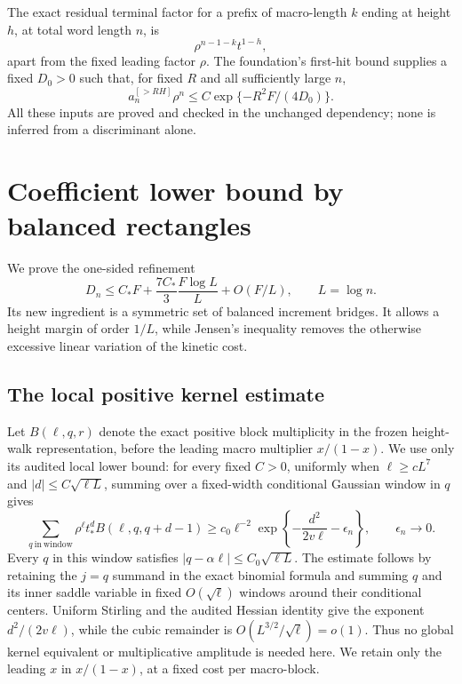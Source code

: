 \documentclass[11pt,letterpaper]{article}
\numberwithin{equation}{section}
\theoremstyle{remark}\newtheorem{remark}[theorem]{Remark}
\begin{document}
The exact residual terminal factor for a prefix of macro-length $k$ ending at height $h$, at total word length $n$, is
\begin{equation}\label{a61:o2:eq:terminal}
 \rho^{n-1-k}t^{1-h},
\end{equation}
apart from the fixed leading factor $\rho$. The foundation's first-hit bound supplies a fixed $D_0>0$ such that, for fixed $R$ and all sufficiently large $n$,
\begin{equation}\label{a61:o2:eq:first-hit}
 a_n^{[>RH]}\rho^n\le C\exp\{-R^2F/(4D_0)\}.
\end{equation}
All these inputs are proved and checked in the unchanged dependency; none is inferred from a discriminant alone.

\section{Coefficient lower bound by balanced rectangles}
\label{a61:o2:low:section}

We prove the one-sided refinement
\begin{equation}\label{a61:o2:low:target}
 D_n\le C_*F+\frac{7C_*}{3}\frac{F\log L}{L}
          +O(F/L),\qquad L=\log n.
\end{equation}
Its new ingredient is a symmetric set of balanced increment bridges.
It allows a height margin of order $1/L$, while Jensen's inequality
removes the otherwise excessive linear variation of the kinetic cost.

\subsection{The local positive kernel estimate}

Let $B(\ell,q,r)$ denote the exact positive block multiplicity in the
frozen height-walk representation, before the leading macro multiplier
$x/(1-x)$. We use only its audited local lower bound: for every fixed
$C>0$, uniformly when $\ell\ge cL^7$ and
$|d|\le C\sqrt{\ell L}$, summing over a fixed-width conditional Gaussian
window in $q$ gives
\begin{equation}\label{a61:o2:low:kernel}
 \sum_{q\ \mathrm{in\ window}}
 \rho^\ell t_*^d B(\ell,q,q+d-1)
 \ge c_0\ell^{-2}
       \exp\left\{-\frac{d^2}{2v\ell}-\epsilon_n\right\},
 \qquad \epsilon_n\longrightarrow0.
\end{equation}
Every $q$ in this window satisfies
$|q-\alpha\ell|\le C_0\sqrt{\ell L}$.
The estimate follows by retaining the $j=q$ summand in the exact
binomial formula and summing $q$ and its inner saddle variable in
fixed $O(\sqrt\ell)$ windows around their conditional centers.
Uniform Stirling and the audited Hessian identity give the exponent
$d^2/(2v\ell)$, while the cubic remainder is
$O(L^{3/2}/\sqrt\ell)=o(1)$. Thus no global kernel equivalent or
multiplicative amplitude is needed here. We retain only the leading
$x$ in $x/(1-x)$, at a fixed cost per macro-block.
\end{document}
